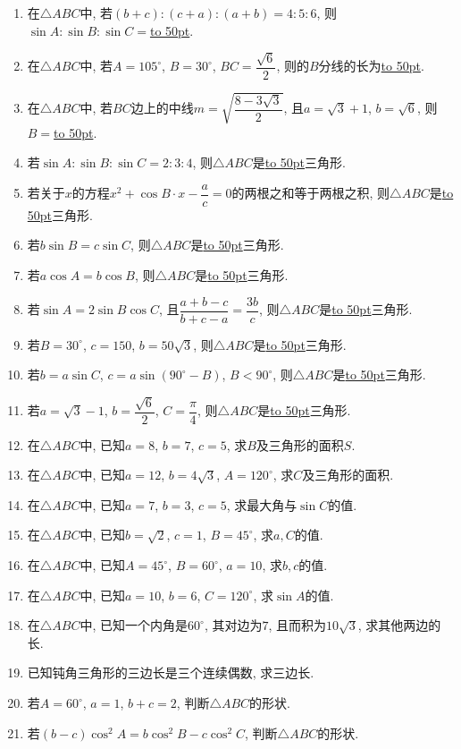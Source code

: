 \documentclass[10pt,a4paper]{article}
\newcommand{\blank}[1]{\underline{\hbox to #1pt{}}}
\begin{document}
\begin{enumerate}[1.]
\item 在$\triangle ABC$中, 若$(b+c):(c+a):(a+b)=4:5:6$, 则$\sin A:\sin B:\sin C=$\blank{50}.
\item 在$\triangle ABC$中, 若$A=105^\circ$, $B=30^\circ$, $BC=\dfrac{\sqrt 6}2$, 则的$B$分线的长为\blank{50}.
\item 在$\triangle ABC$中, 若$BC$边上的中线$m=\sqrt {\dfrac{8-3\sqrt 3}2}$, 且$a=\sqrt 3+1$, $b=\sqrt 6$, 则$B=$\blank{50}.
\item 若$\sin A:\sin B:\sin C=2:3:4$, 则$\triangle ABC$是\blank{50}三角形. 
\item 若关于$x$的方程$x^2+\cos B\cdot x-\dfrac ac=0$的两根之和等于两根之积, 则$\triangle ABC$是\blank{50}三角形. 
\item 若$b\sin B=c\sin C$, 则$\triangle ABC$是\blank{50}三角形. 
\item 若$a\cos A=b\cos B$, 则$\triangle ABC$是\blank{50}三角形. 
\item 若$\sin A=2\sin B\cos C$, 且$\dfrac{a+b-c}{b+c-a}=\dfrac{3b}c$, 则$\triangle ABC$是\blank{50}三角形. 
\item 若$B=30^\circ$, $c=150$, $b=50\sqrt 3$, 则$\triangle ABC$是\blank{50}三角形. 
\item 若$b=a\sin C$, $c=a\sin (90^\circ -B)$, $B<90^\circ$, 则$\triangle ABC$是\blank{50}三角形. 
\item 若$a=\sqrt 3-1$, $b=\dfrac{\sqrt 6}2$, $C=\dfrac{\pi}4$, 则$\triangle ABC$是\blank{50}三角形. 
\item 在$\triangle ABC$中, 已知$a=8$, $b=7$, $c=5$, 求$B$及三角形的面积$S$.
\item 在$\triangle ABC$中, 已知$a=12$, $b=4\sqrt 3$, $A=120^\circ$, 求$C$及三角形的面积.
\item 在$\triangle ABC$中, 已知$a=7$, $b=3$, $c=5$, 求最大角与$\sin C$的值.
\item 在$\triangle ABC$中, 已知$b=\sqrt 2$, $c=1$, $B=45^\circ$, 求$a,C$的值.
\item 在$\triangle ABC$中, 已知$A=45^\circ$, $B=60^\circ$, $a=10$, 求$b,c$的值.
\item 在$\triangle ABC$中, 已知$a=10$, $b=6$, $C=120^\circ$, 求$\sin A$的值.
\item 在$\triangle ABC$中, 已知一个内角是$60^\circ$, 其对边为$7$, 且而积为$10\sqrt 3$, 求其他两边的长.
\item 已知钝角三角形的三边长是三个连续偶数, 求三边长.
\item 若$A=60^\circ$, $a=1$, $b+c=2$, 判断$\triangle ABC$的形状.
\item 若$(b-c)\cos ^2A=b\cos ^2B-c\cos ^2C$, 判断$\triangle ABC$的形状.

\end{enumerate}
\end{document}
